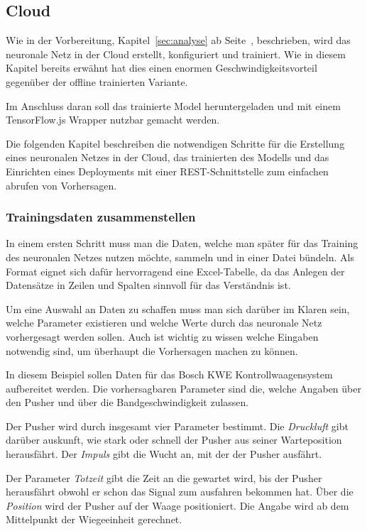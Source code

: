 \subsection{Cloud}
Wie in der Vorbereitung, Kapitel~\ref{sec:analyse} ab Seite~\pageref{sec:analyse}, beschrieben, wird das neuronale Netz
in der Cloud erstellt, konfiguriert und trainiert. Wie in diesem Kapitel bereits erwähnt hat dies einen enormen
Geschwindigkeitsvorteil gegenüber der offline trainierten Variante.

Im Anschluss daran soll das trainierte Model heruntergeladen und mit einem TensorFlow.js Wrapper nutzbar gemacht werden.

Die folgenden Kapitel beschreiben die notwendigen Schritte für die Erstellung eines neuronalen Netzes in der Cloud, das
trainierten des Modells und das Einrichten eines Deployments mit einer REST-Schnittstelle zum einfachen abrufen von
Vorhersagen.

\subsubsection{Trainingsdaten zusammenstellen}
In einem ersten Schritt muss man die Daten, welche man später für das Training des neuronalen Netzes nutzen möchte,
sammeln und in einer Datei bündeln. Als Format eignet sich dafür hervorragend eine Excel-Tabelle, da das Anlegen der
Datensätze in Zeilen und Spalten sinnvoll für das Verständnis ist.

Um eine Auswahl an Daten zu schaffen muss man sich darüber im Klaren sein, welche Parameter existieren und welche Werte
durch das neuronale Netz vorhergesagt werden sollen. Auch ist wichtig zu wissen welche Eingaben notwendig sind, um
überhaupt die Vorhersagen machen zu können.

In diesem Beispiel sollen Daten für das Bosch KWE Kontrollwaagensystem aufbereitet werden. Die vorhersagbaren Parameter
sind die, welche Angaben über den Pusher und über die Bandgeschwindigkeit zulassen.

Der Pusher wird durch insgesamt vier Parameter bestimmt. Die \textit{Druckluft} gibt darüber auskunft, wie stark oder
schnell der Pusher aus seiner Warteposition herausfährt. Der \textit{Impuls} gibt die Wucht an, mit der der Pusher
ausfährt.

Der Parameter \textit{Totzeit} gibt die Zeit an die gewartet wird, bis der Pusher herausfährt obwohl er schon das Signal
zum ausfahren bekommen hat. Über die \textit{Position} wird der Pusher auf der Waage positioniert. Die Angabe wird ab
dem Mittelpunkt der Wiegeeinheit gerechnet.

